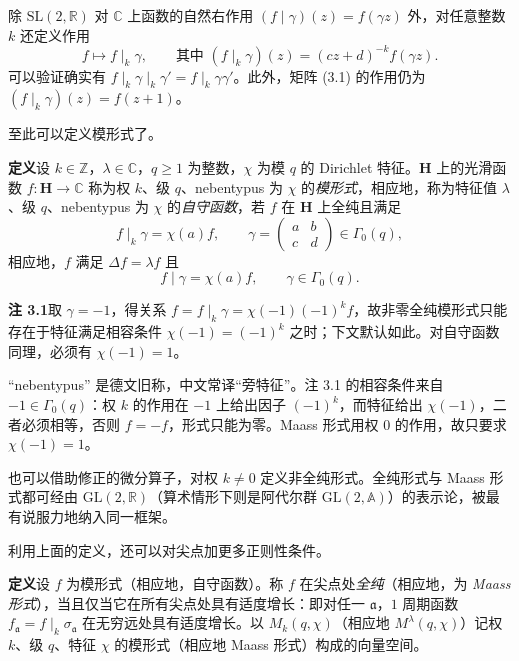 除 $\mathrm{SL}(2,\mathbb{R})$ 对 $\mathbb{C}$ 上函数的自然右作用 $(f\mid\gamma)(z)=f(\gamma z)$ 外，对任意整数 $k$ 还定义作用
\[
f\mapsto f\mid_{k}\gamma,\qquad\text{其中 }(f\mid_{k}\gamma)(z)=(cz+d)^{-k}f(\gamma z).
\]
可以验证确实有 $f\mid_{k}\gamma\mid_{k}\gamma'=f\mid_{k}\gamma\gamma'$。此外，矩阵 (3.1) 的作用仍为 $(f\mid_{k}\gamma)(z)=f(z+1)$。

至此可以定义模形式了。

\par\medskip\noindent\textbf{定义}\quad 设 $k\in\mathbb{Z}$，$\lambda\in\mathbb{C}$，$q\ge1$ 为整数，$\chi$ 为模 $q$ 的 Dirichlet 特征。$\mathbf{H}$ 上的光滑函数 $f\colon\mathbf{H}\to\mathbb{C}$ 称为权 $k$、级 $q$、nebentypus 为 $\chi$ 的\emph{模形式}，相应地，称为特征值 $\lambda$、级 $q$、nebentypus 为 $\chi$ 的\emph{自守函数}，若 $f$ 在 $\mathbf{H}$ 上全纯且满足
\[
f\mid_{k}\gamma=\chi(a)f,\qquad\gamma=\begin{pmatrix}a&b\\c&d\end{pmatrix}\in\Gamma_{0}(q),
\]
相应地，$f$ 满足 $\Delta f=\lambda f$ 且
\[
f\mid\gamma=\chi(a)f,\qquad\gamma\in\Gamma_{0}(q).
\]

\par\medskip\noindent\textbf{注 3.1}\quad 取 $\gamma=-1$，得关系 $f=f\mid_{k}\gamma=\chi(-1)(-1)^{k}f$，故非零全纯模形式只能存在于特征满足相容条件 $\chi(-1)=(-1)^{k}$ 之时；下文默认如此。对自守函数同理，必须有 $\chi(-1)=1$。

\begin{annote}
“nebentypus” 是德文旧称，中文常译“旁特征”。注 3.1 的相容条件来自 $-1\in\Gamma_{0}(q)$：权 $k$ 的作用在 $-1$ 上给出因子 $(-1)^{k}$，而特征给出 $\chi(-1)$，二者必须相等，否则 $f=-f$，形式只能为零。Maass 形式用权 $0$ 的作用，故只要求 $\chi(-1)=1$。
\par\vspace{0.15em}{\raggedleft 【来源：原书 §3（A）；Iwaniec《Topics in Classical Automorphic Forms》第 2--3 章（A）】\par}
\end{annote}

也可以借助修正的微分算子，对权 $k\ne0$ 定义非全纯形式。全纯形式与 Maass 形式都可经由 $\mathrm{GL}(2,\mathbb{R})$（算术情形下则是阿代尔群 $\mathrm{GL}(2,\mathbb{A})$）的表示论，被最有说服力地纳入同一框架。

利用上面的定义，还可以对尖点加更多正则性条件。

\par\medskip\noindent\textbf{定义}\quad 设 $f$ 为模形式（相应地，自守函数）。称 $f$ 在尖点处\emph{全纯}（相应地，为 \emph{Maass 形式}），当且仅当它在所有尖点处具有适度增长：即对任一 $\mathfrak{a}$，$1$ 周期函数 $f_{\mathfrak{a}}=f\mid_{k}\sigma_{\mathfrak{a}}$ 在无穷远处具有适度增长。以 $M_{k}(q,\chi)$（相应地 $M^{\lambda}(q,\chi)$）记权 $k$、级 $q$、特征 $\chi$ 的模形式（相应地 Maass 形式）构成的向量空间。

